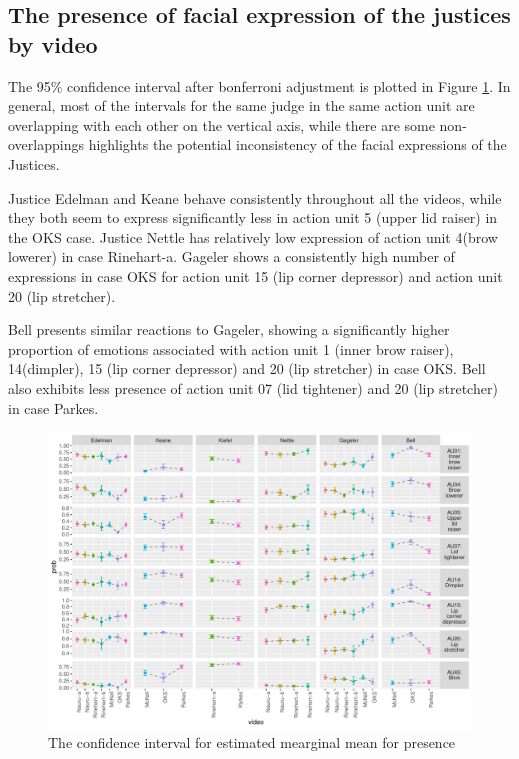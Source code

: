 \documentclass{monashthesis}
\begin{document}
\hypertarget{the-presence-of-facial-expression-of-the-justices-by-video}{%
\subsection{The presence of facial expression of the justices by video}\label{the-presence-of-facial-expression-of-the-justices-by-video}}

The 95\% confidence interval after bonferroni adjustment is plotted in Figure \ref{fig:model2-plot}. In general, most of the intervals for the same judge in the same action unit are overlapping with each other on the vertical axis, while there are some non-overlappings highlights the potential inconsistency of the facial expressions of the Justices.

Justice Edelman and Keane behave consistently throughout all the videos, while they both seem to express significantly less in action unit 5 (upper lid raiser) in the OKS case. Justice Nettle has relatively low expression of action unit 4(brow lowerer) in case Rinehart-a. Gageler shows a consistently high number of expressions in case OKS for action unit 15 (lip corner depressor) and action unit 20 (lip stretcher).

Bell presents similar reactions to Gageler, showing a significantly higher proportion of emotions associated with action unit 1 (inner brow raiser), 14(dimpler), 15 (lip corner depressor) and 20 (lip stretcher) in case OKS. Bell also exhibits less presence of action unit 07 (lid tightener) and 20 (lip stretcher) in case Parkes.

\begin{figure}

{\centering \includegraphics[width=1\linewidth]{figures/model2-plot-1} 

}

\caption{The confidence interval for estimated mearginal mean for presence}\label{fig:model2-plot}
\end{figure}
\end{document}
